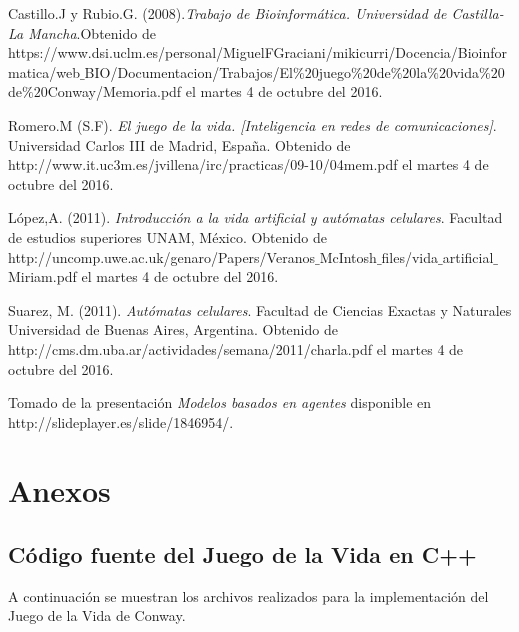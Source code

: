 \documentclass[12pt,letterpaper]{article}
\begin{document}
\newpage 
\begin{thebibliography}{1}

 Castillo.J y Rubio.G. (2008).\textit{Trabajo de Bioinformática. Universidad de Castilla-La Mancha}.Obtenido de https://www.dsi.uclm.es/personal/MiguelFGraciani/mikicurri/Docencia/Bioinformatica/web$\_$BIO/Documentacion/Trabajos/El$\%20$juego$\%20$de$\%20$la$\%20$vida$\%20$de$\%20$Conway/Memoria.pdf el martes 4 de octubre del 2016.

Romero.M (S.F). \textit{El juego de la vida. [Inteligencia en redes de comunicaciones]}. Universidad Carlos III de Madrid, España. Obtenido de http://www.it.uc3m.es/jvillena/irc/practicas/09-10/04mem.pdf el martes 4 de octubre del 2016.

López,A. (2011). \textit{Introducción a la vida artificial y autómatas celulares}. Facultad de estudios superiores UNAM, México. Obtenido de http://uncomp.uwe.ac.uk/genaro/Papers/Veranos$\_$McIntosh$\_$files/vida$\_$artificial$\_$Miriam.pdf el martes 4 de octubre del 2016.

Suarez, M. (2011). \textit{Autómatas celulares}. Facultad de Ciencias Exactas y Naturales Universidad de Buenas Aires, Argentina. Obtenido de http://cms.dm.uba.ar/actividades/semana/2011/charla.pdf el martes 4 de octubre del 2016.

 Tomado de la presentación \textit{Modelos basados en agentes} disponible en http://slideplayer.es/slide/1846954/.
\end{thebibliography}


\newpage

\section{Anexos}

\subsection{Código fuente del Juego de la Vida en C++}
A continuación se muestran los archivos realizados para la implementación del Juego de la Vida de Conway.
\end{document}
